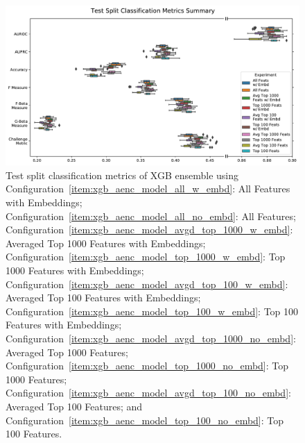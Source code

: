 \documentclass[\main/thesis.tex]{subfiles}
\begin{document}
\begin{figure}[h]
    \centering
    \includegraphics[trim={0.2cm 0.3cm 0.2cm 0.1cm},clip,width=\textwidth]{figure/xgb_aenc_classification_metrics.pdf}
    \caption[Test split classification metrics of XGB ensemble using all configurations of engineered features and autoencoder embeddings.]{Test split classification metrics of XGB ensemble using
    Configuration~\ref{item:xgb_aenc_model_all_w_embd}: All Features with Embeddings;
    Configuration~\ref{item:xgb_aenc_model_all_no_embd}: All Features;
    Configuration~\ref{item:xgb_aenc_model_avgd_top_1000_w_embd}: Averaged Top 1000 Features with Embeddings;
    Configuration~\ref{item:xgb_aenc_model_top_1000_w_embd}: Top 1000 Features with Embeddings;
    Configuration~\ref{item:xgb_aenc_model_avgd_top_100_w_embd}: Averaged Top 100 Features with Embeddings;
    Configuration~\ref{item:xgb_aenc_model_top_100_w_embd}: Top 100 Features with Embeddings;
    Configuration~\ref{item:xgb_aenc_model_avgd_top_1000_no_embd}: Averaged Top 1000 Features;
    Configuration~\ref{item:xgb_aenc_model_top_1000_no_embd}: Top 1000 Features;
    Configuration~\ref{item:xgb_aenc_model_avgd_top_100_no_embd}: Averaged Top 100 Features; and
    Configuration~\ref{item:xgb_aenc_model_top_100_no_embd}: Top 100 Features.
    }
    \label{fig:xgb_aenc_classification_metrics}
\end{figure}
\end{document}
